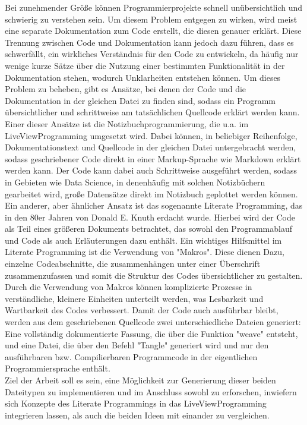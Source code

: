 \documentclass[11pt]{article}
\begin{document}
Bei zunehmender Größe können Programmierprojekte schnell unübersichtlich und schwierig zu verstehen sein. Um diesem Problem entgegen zu wirken, wird meist eine separate Dokumentation zum Code erstellt, die diesen genauer erklärt. Diese Trennung zwischen Code und Dokumentation kann jedoch dazu führen, dass es schwerfällt, ein wirkliches Verständnis für den Code zu entwickeln, da häufig nur wenige kurze Sätze über die Nutzung einer bestimmten Funktionalität in der Dokumentation stehen, wodurch Unklarheiten entstehen können. Um dieses Problem zu beheben, gibt es Ansätze, bei denen der Code und die Dokumentation in der gleichen Datei zu finden sind, sodass ein Programm übersichtlicher und schrittweise am tatsächlichen Quellcode erklärt werden kann. Einer dieser Ansätze ist die Notizbuchprogrammierung, die u.a. im LiveViewProgramming umgesetzt wird. Dabei können, in beliebiger Reihenfolge, Dokumentationstext und Quellcode in der gleichen Datei untergebracht werden, sodass geschriebener Code direkt in einer Markup-Sprache wie Markdown erklärt werden kann. Der Code kann dabei auch Schrittweise ausgeführt werden, sodass in Gebieten wie Data Science, in denenhäufig mit solchen Notizbüchern gearbeitet wird, große Datensätze direkt im Notizbuch geplottet werden können.\\ Ein anderer, aber ähnlicher Ansatz ist das sogenannte Literate Programming, das in den 80er Jahren von Donald E. Knuth erdacht wurde. Hierbei wird der Code als Teil eines größeren Dokuments betrachtet, das sowohl den Programmablauf und Code als auch Erläuterungen dazu enthält. Ein wichtiges Hilfsmittel im Literate Programming ist die Verwendung von "Makros". Diese dienen Dazu, einzelne Codeabschnitte, die zusammenhängen unter einer Überschrift zusammenzufassen und somit die Struktur des Codes übersichtlicher zu gestalten. Durch die Verwendung von Makros können komplizierte Prozesse in verständliche, kleinere Einheiten unterteilt werden, was Lesbarkeit und Wartbarkeit des Codes verbessert. Damit der Code auch ausführbar bleibt, werden aus dem geschriebenen Quellcode zwei unterschiedliche Dateien generiert: Eine vollständig dokumentierte Fassung, die über die Funktion "weave" entsteht, und eine Datei, die über den Befehl "Tangle" generiert wird und nur den ausführbaren bzw. Compilierbaren Programmcode in der eigentlichen Programmiersprache enthält.\\
\newline
Ziel der Arbeit soll es sein, eine Möglichkeit zur Generierung dieser beiden Dateitypen zu implementieren und im Anschluss sowohl zu erforschen, inwiefern sich Konzepte des Literate Programmings in das LiveViewProgramming integrieren lassen, als auch die beiden Ideen mit einander zu vergleichen. 
\end{document}
